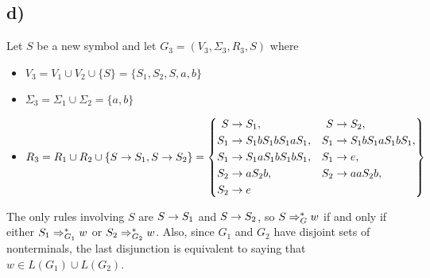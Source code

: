 \newpage
\subsection*{d)}


Let $S$ be a new symbol and let $G_3 = \left( V_3, \Sigma_3, R_3, S \right)$
where
\begin{itemize}
  \item $V_3 = V_1 \cup V_2 \cup \{ S \} = \{ S_1, S_2, S, a, b \}$
  \item $\Sigma_3 = \Sigma_1 \cup \Sigma_2 = \{ a, b \}$
  \item $R_3 = R_1 \cup R_2 \cup \left\{ S \rightarrow S_1, S \rightarrow S_2 \right\} 
    = \left\{  
      \begin{aligned}
        S &\rightarrow S_1, & S &\rightarrow S_2,\\
        S_1 &\rightarrow S_1bS_1bS_1aS_1, & S_1 &\rightarrow S_1bS_1aS_1bS_1,\\
        S_1 &\rightarrow S_1aS_1bS_1bS_1, & S_1 &\rightarrow e,\\
        S_2 &\rightarrow aS_2b, & S_2 &\rightarrow aaS_2b,\\
        S_2 &\rightarrow e
      \end{aligned} 
    \right\}$
\end{itemize}

The only rules involving $S$ are $S \rightarrow S_1$ and $S \rightarrow S_2$, so $S \Rightarrow_G^* w$ if and only if either $S_1 \Rightarrow_{G_1}^* w$ or $S_2 \Rightarrow_{G_2}^* w$. Also, since $G_1$ and $G_2$ have disjoint sets of nonterminals, the last disjunction is equivalent to saying that $w \in L(G_1) \cup L(G_2)$.
